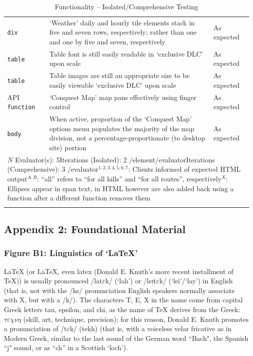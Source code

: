 \documentclass[11pt, english]{article}
\begin{document}
\begin{center}
\begin{longtable}{p{3cm}p{8cm}p{2cm}}
		\texttt{div} & `Weather' daily and hourly tile elements stack in five and seven rows, respectively; rather than one and one by five and seven, respectively & As expected\\
		\texttt{table} & Table font is still easily readable in `exclusive DLC' upon scale & As expected\\
		\texttt{table} & Table images are still an appropriate size to be easily viewable `exclusive DLC' upon scale & As expected\\
		API \texttt{function} & `Conquest Map' map pans effectively using finger control & As expected\\
		\texttt{body} & When active, proportion of the `Conquest Map' options menu populates the majority of the map division, not a percentage-proportionate (to desktop site) portion & As expected\\
		\hline
		\multicolumn{3}{p{12.5cm}}{$N$ Evaluator(s): 5\newline Iterations (Isolated): 2 /element/evaluator\newline Iterations (Comprehensive): 3 /evaluator\newline $^{1,2,3,4,5,6,7}$: Clients informed of expected HTML output\newline $^{A,B}$: ``all'' refers to ``for all hills'' and ``for all routes'', respectively\newline $^{X}$: Ellipses appear in span text, in HTML however are also added back using a function after a different function removes them}\\
		\hline
		\caption{Functionality -- Isolated/Comprehensive Testing}
	\end{longtable}
	\end{center}

\newpage

	\subsection*{Appendix 2: Foundational Material}

		\subsubsection*{Figure B1: Linguistics of `{\LaTeX}'}

	{\LaTeX} (or LaTeX, even latex (Donald E. Knuth's more recent installment of {\TeX})) is usually pronounced /la\textlengthmark t$\varepsilon$k/ (`lah') or /le\textsc{i}t$\varepsilon$k/ (`lei'/`lay') in English (that is, not with the /ks/ pronunciation English speakers normally associate with X, but with a /k/). The characters T, E, X in the name come from capital Greek letters tau, epsilon, and chi, as the name of {\TeX} derives from the Greek: $\tau\varepsilon\chi\nu\eta$ (skill, art, technique, precision); for this reason, Donald E. Knuth promotes a pronunciation of /t$\varepsilon$k/ (tekh) (that is, with a voiceless velar fricative as in Modern Greek, similar to the last sound of the German word ``Bach", the Spanish ``j" sound, or as ``ch'' in a Scottish `loch'). 
\end{document}
